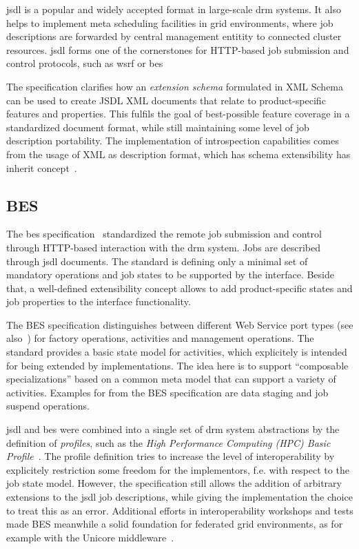 \documentclass[twocolumn]{svjour3}       %
\begin{document}
\gls{jsdl} is a popular and widely accepted format in large-scale \gls{drm} systems. It also helps to implement meta scheduling facilities in grid environments, where job descriptions are forwarded by central management entitity to connected cluster resources. \gls{jsdl} forms one of the cornerstones for HTTP-based job submission and control protocols, such as \gls{wsrf} or \gls{bes}

The specification clarifies how an \emph{extension schema} formulated in XML Schema can be used to create JSDL XML documents that relate to product-specific features and properties. This fulfils the goal of best-possible feature coverage in a standardized document format, while still maintaining some level of job description portability. The implementation of introspection capabilities comes from the usage of XML as description format, which has schema extensibility has inherit concept~\cite{xmlschema}. 

\subsection{BES}

The \gls{bes} specification~\cite{gfd.108} standardized the remote job submission and control through HTTP-based interaction with the \gls{drm} system. Jobs are described through \gls{jsdl} documents. The standard is defining only a minimal set of mandatory operations and job states to be supported by the interface. Beside that, a well-defined extensibility concept allows to add product-specific states and job properties to the interface functionality. 

The BES specification distinguishes between different Web Service port types (see also~\cite{citemaster_579}) for factory operations, activities and management operations. The standard provides a basic state model for activities, which explicitely is intended for being extended by implementations. The idea here is to support ``composable specializations'' based on a common meta model that can support a variety of activities. Examples for from the BES specification are data staging and job suspend operations.

\gls{jsdl} and \gls{bes} were combined into a single set of \gls{drm} system abstractions by the definition of \emph{profiles}, such as the \emph{High Performance Computing (HPC) Basic Profile}~\cite{citemaster_9643}. The profile definition tries to increase the level of interoperability by explicitely restriction some freedom for the implementors, f.e. with respect to the job state model. However, the specification still allows the addition of arbitrary extensions to the \gls{jsdl} job descriptions, while giving the implementation the choice to treat this as an error. Additional efforts in interoperability workshops and tests made BES meanwhile a solid foundation for federated grid environments, as for example with the Unicore middleware~\cite{citemaster_9641}.
\end{document}
